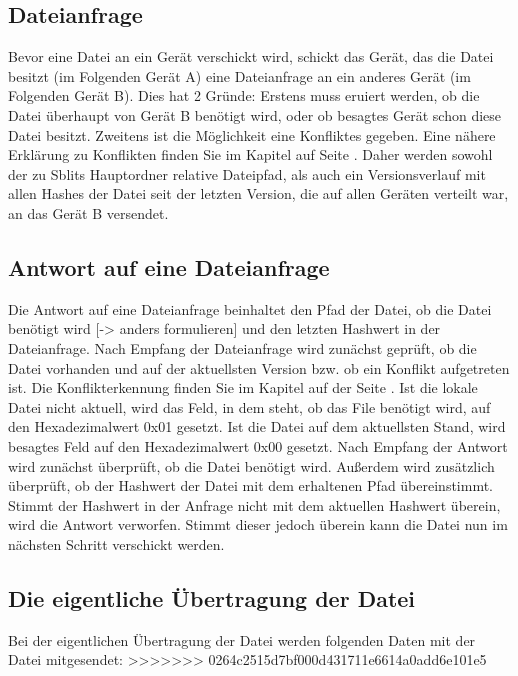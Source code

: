 \subsection{Dateianfrage}
Bevor eine Datei an ein Gerät verschickt wird, schickt das Gerät, das die Datei besitzt (im Folgenden Gerät A) eine Dateianfrage an ein anderes Gerät (im Folgenden Gerät B). Dies hat 2 Gründe: Erstens muss eruiert werden, ob die Datei überhaupt von Gerät B benötigt wird, oder ob besagtes Gerät schon diese Datei besitzt. Zweitens ist die Möglichkeit eine Konfliktes gegeben. Eine nähere Erklärung zu Konflikten finden Sie im Kapitel  auf Seite \pageref{Konflikt}. Daher werden sowohl der zu Sblits Hauptordner relative Dateipfad, als auch ein Versionsverlauf mit allen Hashes der Datei seit der letzten Version, die auf allen Geräten verteilt war, an das Gerät B versendet. 

\subsection{Antwort auf eine Dateianfrage}
Die Antwort auf eine Dateianfrage beinhaltet den Pfad der Datei, ob die Datei benötigt wird [-> anders formulieren] und den letzten Hashwert in der Dateianfrage. Nach Empfang der Dateianfrage wird zunächst geprüft, ob die Datei vorhanden und auf der aktuellsten Version bzw. ob ein Konflikt aufgetreten ist. Die Konflikterkennung finden Sie im Kapitel  auf der Seite \pageref{Konflikterkennung}. Ist die lokale Datei nicht aktuell, wird das Feld, in dem steht, ob das File benötigt wird, auf den Hexadezimalwert 0x01 gesetzt. Ist die Datei auf dem aktuellsten Stand, wird besagtes Feld auf den Hexadezimalwert 0x00 gesetzt. 
Nach Empfang der Antwort wird zunächst überprüft, ob die Datei benötigt wird. Außerdem wird zusätzlich überprüft, ob der Hashwert der Datei mit dem erhaltenen Pfad übereinstimmt. Stimmt der Hashwert in der Anfrage nicht mit dem aktuellen Hashwert überein, wird die Antwort verworfen. Stimmt dieser jedoch überein kann die Datei nun im nächsten Schritt verschickt werden.

\subsection{Die eigentliche Übertragung der Datei}
Bei der eigentlichen Übertragung der Datei werden folgenden Daten mit der Datei mitgesendet:
>>>>>>> 0264c2515d7bf000d431711e6614a0add6e101e5

